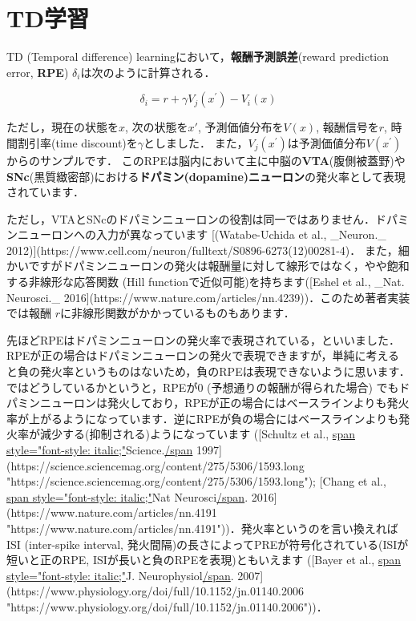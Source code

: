 \section{TD学習}

TD (Temporal difference) learningにおいて，\textbf{報酬予測誤差}(reward prediction error, \textbf{RPE}) $\delta_{i}$は次のように計算される． 

 
\begin{equation}
\delta_{i}=r+\gamma V_{j}\left(x^{\prime}\right)-V_{i}(x) 
\end{equation}
 

ただし，現在の状態を$x$, 次の状態を$x'$, 予測価値分布を$V(x)$, 報酬信号を$r$, 時間割引率(time discount)を$\gamma$としました．
また，$V_{j}\left(x^{\prime}\right)$は予測価値分布$V\left(x^{\prime}\right)$からのサンプルです． このRPEは脳内において主に中脳の\textbf{VTA}(腹側被蓋野)や\textbf{SNc}(黒質緻密部)における\textbf{ドパミン(dopamine)ニューロン}の発火率として表現されています．

ただし，VTAとSNcのドパミンニューロンの役割は同一ではありません．ドパミンニューロンへの入力が異なっています [(Watabe-Uchida et al., _Neuron._ 2012)](https://www.cell.com/neuron/fulltext/S0896-6273(12)00281-4)． また，細かいですがドパミンニューロンの発火は報酬量に対して線形ではなく，やや飽和する非線形な応答関数 (Hill functionで近似可能)を持ちます([Eshel et al., _Nat. Neurosci._ 2016](https://www.nature.com/articles/nn.4239))．このため著者実装では報酬 $r$に非線形関数がかかっているものもあります．

先ほどRPEはドパミンニューロンの発火率で表現されている，といいました．RPEが正の場合はドパミンニューロンの発火で表現できますが，単純に考えると負の発火率というものはないため，負のRPEは表現できないように思います．ではどうしているかというと，RPEが0 (予想通りの報酬が得られた場合) でもドパミンニューロンは発火しており，RPEが正の場合にはベースラインよりも発火率が上がるようになっています．逆にRPEが負の場合にはベースラインよりも発火率が減少する(抑制される)ようになっています
    ([Schultz et al., \url{span style="font-style: italic;"}Science.\url{/span} 1997](https://science.sciencemag.org/content/275/5306/1593.long "https://science.sciencemag.org/content/275/5306/1593.long"); [Chang et al., \url{span style="font-style: italic;"}Nat Neurosci\url{/span}. 2016](https://www.nature.com/articles/nn.4191 "https://www.nature.com/articles/nn.4191"))．発火率というのを言い換えればISI (inter-spike interval, 発火間隔)の長さによってPREが符号化されている(ISIが短いと正のRPE, ISIが長いと負のRPEを表現)ともいえます ([Bayer et al., \url{span style="font-style: italic;"}J.
    Neurophysiol\url{/span}. 2007](https://www.physiology.org/doi/full/10.1152/jn.01140.2006 "https://www.physiology.org/doi/full/10.1152/jn.01140.2006"))．


